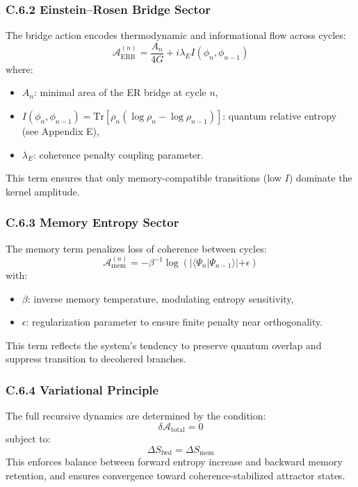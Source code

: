 \subsubsection*{C.6.2 Einstein–Rosen Bridge Sector}

The bridge action encodes thermodynamic and informational flow across cycles:
\begin{equation}
\mathcal{A}_{\text{ERB}}^{(n)} = \frac{A_n}{4G} + i\lambda_E I(\phi_n, \phi_{n-1})
\end{equation}
where:
\begin{itemize}
  \item \( A_n \): minimal area of the ER bridge at cycle \( n \),
  \item \( I(\phi_n, \phi_{n-1}) = \mathrm{Tr}\left[ \rho_n (\log \rho_n - \log \rho_{n-1}) \right] \): quantum relative entropy (see Appendix E),
  \item \( \lambda_E \): coherence penalty coupling parameter.
\end{itemize}

This term ensures that only memory-compatible transitions (low \( I \)) dominate the kernel amplitude.

\subsubsection*{C.6.3 Memory Entropy Sector}

The memory term penalizes loss of coherence between cycles:
\begin{equation}
\mathcal{A}_{\text{mem}}^{(n)} = -\beta^{-1} \log \left( |\langle \Psi_n | \Psi_{n-1} \rangle| + \epsilon \right)
\end{equation}
with:
\begin{itemize}
  \item \( \beta \): inverse memory temperature, modulating entropy sensitivity,
  \item \( \epsilon \): regularization parameter to ensure finite penalty near orthogonality.
\end{itemize}

This term reflects the system’s tendency to preserve quantum overlap and suppress transition to decohered branches.

\subsubsection*{C.6.4 Variational Principle}

The full recursive dynamics are determined by the condition:
\begin{equation}
\delta \mathcal{A}_{\text{total}} = 0
\end{equation}
subject to:
\begin{equation}
\Delta S_{\text{fwd}} = \Delta S_{\text{mem}}
\end{equation}
This enforces balance between forward entropy increase and backward memory retention, and ensures convergence toward coherence-stabilized attractor states.

